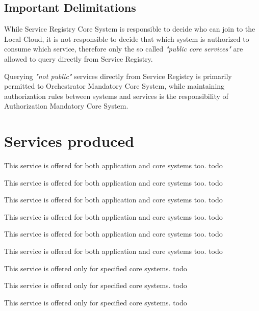 \documentclass[a4paper]{arrowhead}
\begin{document}
\subsection{Important Delimitations}
\label{sec:delimitations}

While Service Registry Core System is responsible to decide who can join to the Local Cloud, it is not responsible to decide that which system is authorized to consume which service, therefore only the so called \textit{"public core services"} are allowed to query directly from Service Registry.

Querying \textit{"not public"} services directly from Service Registry is primarily permitted to Orchestrator Mandatory Core System, while maintaining authorization rules between systems and services is the responsibility of Authorization Mandatory Core System.

\newpage

\section{Services produced}
\label{sec:services}

This service is offered for both application and core systems too. \color{red}todo\color{black}

This service is offered for both application and core systems too.
\color{red}todo\color{black}

This service is offered for both application and core systems too.
\color{red}todo\color{black}

This service is offered for both application and core systems too.
\color{red}todo\color{black}

This service is offered for both application and core systems too.
\color{red}todo\color{black}

This service is offered for both application and core systems too.
\color{red}todo\color{black}

This service is offered only for specified core systems.
\color{red}todo\color{black}

This service is offered only for specified core systems.
\color{red}todo\color{black}

This service is offered only for specified core systems.
\color{red}todo\color{black}
\end{document}

